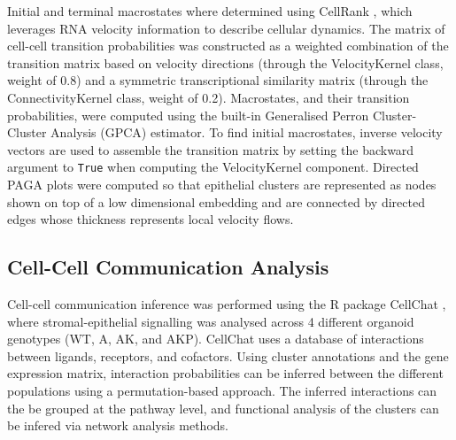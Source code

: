 Initial and terminal macrostates where determined using CellRank \cite{lange_cellrank_2022}, which leverages RNA velocity information to describe cellular dynamics. The matrix of cell-cell transition probabilities was constructed as a weighted combination of the transition matrix based on velocity directions (through the VelocityKernel class, weight of 0.8) and a symmetric transcriptional similarity matrix (through the ConnectivityKernel class, weight of 0.2). Macrostates, and their transition probabilities, were computed using the built-in Generalised Perron Cluster-Cluster Analysis (GPCA) estimator. To find initial macrostates, inverse velocity vectors are used to assemble the transition matrix by setting the backward argument to \texttt{True} when computing the VelocityKernel component. Directed PAGA plots \cite{wolf_paga_2019, lange_cellrank_2022} were computed so that epithelial clusters are represented as nodes shown on top of a low dimensional embedding and are connected by directed edges whose thickness represents local velocity flows.

\subsection{Cell-Cell Communication Analysis}

Cell-cell communication inference was performed using the R package CellChat \cite{jin_inference_2021}, where stromal-epithelial signalling was analysed across 4 different organoid genotypes (WT, A, AK, and AKP). CellChat uses a database of interactions between ligands, receptors, and cofactors. 
Using cluster annotations and the gene expression matrix, interaction probabilities can be inferred between the different populations using a permutation-based approach. The inferred interactions can the be grouped at the pathway level, and functional analysis of the clusters can be infered via network analysis methods. 

